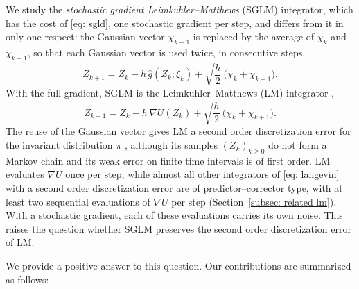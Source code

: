 \documentclass{article}
\newcommand{\Ge}{\geqslant}
\numberwithin{equation}{section}
\begin{document}
We study the \emph{stochastic gradient Leimkuhler--Matthews} (SGLM) integrator, which has the cost of \eqref{eq: sgld}, one stochastic gradient per step, and differs from it in only one respect: the Gaussian vector $\chi_{k+1}$ is replaced by the average of $\chi_k$ and $\chi_{k+1}$, so that each Gaussian vector is used twice, in consecutive steps,
\begin{equation}
    Z_{k+1} = Z_k - h\, \hat g(Z_k; \xi_k) + \sqrt{\frac h2}\, \bigl( \chi_k + \chi_{k+1} \bigr) .
    \label{eq: sglm}
    \tag{SGLM}
\end{equation}
With the full gradient, SGLM is the Leimkuhler--Matthews (LM) integrator \citep{leimkuhler2013rational, vilmart2015postprocessed},
\begin{equation}
    Z_{k+1} = Z_k - h\, \nabla U(Z_k) + \sqrt{\frac h2}\, \bigl( \chi_k + \chi_{k+1} \bigr) .
    \label{eq: lm}
    \tag{LM}
\end{equation}
The reuse of the Gaussian vector gives LM a second order discretization error for the invariant distribution $\pi$ \citep{leimkuhler2013rational, leimkuhler2014long, vilmart2015postprocessed}, although its samples $(Z_k)_{k \Ge 0}$ do not form a Markov chain and its weak error on finite time intervals is of first order. LM evaluates $\nabla U$ once per step, while almost all other integrators of \eqref{eq: langevin} with a second order discretization error are of predictor--corrector type, with at least two sequential evaluations of $\nabla U$ per step (Section~\ref{subsec: related lm}). With a stochastic gradient, each of these evaluations carries its own noise. This raises the question whether SGLM preserves the second order discretization error of LM.

We provide a positive answer to this question. Our contributions are summarized as follows:
\end{document}
